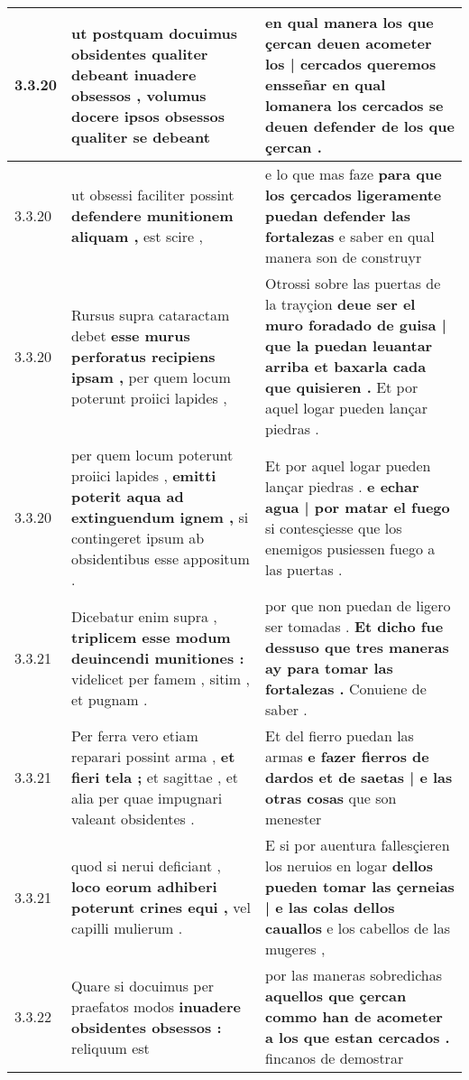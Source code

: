 \begin{tabular}{|p{1cm}|p{6.5cm}|p{6.5cm}|}
3.3.20 & ut postquam docuimus obsidentes qualiter debeant inuadere obsessos , \textbf{ volumus docere ipsos obsessos qualiter } se debeant & en qual manera \textbf{ los que çercan deuen acometer los | cercados queremos ensseñar en qual } lomanera los cercados se deuen defender de los que çercan . \\\hline
3.3.20 & ut obsessi faciliter possint \textbf{ defendere munitionem aliquam , } est scire , & e lo que mas faze \textbf{ para que los çercados ligeramente puedan defender las fortalezas } e saber en qual manera son de construyr \\\hline
3.3.20 & Rursus supra cataractam debet \textbf{ esse murus perforatus recipiens ipsam , } per quem locum poterunt proiici lapides , & Otrossi sobre las puertas de la trayçion \textbf{ deue ser el muro foradado de guisa | que la puedan leuantar arriba et baxarla cada que quisieren . } Et por aquel logar pueden lançar piedras . \\\hline
3.3.20 & per quem locum poterunt proiici lapides , \textbf{ emitti poterit aqua ad extinguendum ignem , } si contingeret ipsum ab obsidentibus esse appositum . & Et por aquel logar pueden lançar piedras . \textbf{ e echar agua | por matar el fuego } si contesçiesse que los enemigos pusiessen fuego a las puertas . \\\hline
3.3.21 & Dicebatur enim supra , \textbf{ triplicem esse modum deuincendi munitiones : } videlicet per famem , sitim , et pugnam . & por que non puedan de ligero ser tomadas . \textbf{ Et dicho fue dessuso que tres maneras ay para tomar las fortalezas . } Conuiene de saber . \\\hline
3.3.21 & Per ferra vero etiam reparari possint arma , \textbf{ et fieri tela ; } et sagittae , et alia per quae impugnari valeant obsidentes . & Et del fierro puedan las armas \textbf{ e fazer fierros de dardos et de saetas | e las otras cosas } que son menester \\\hline
3.3.21 & quod si nerui deficiant , \textbf{ loco eorum adhiberi poterunt crines equi , } vel capilli mulierum . & E si por auentura fallesçieren los neruios en logar \textbf{ dellos pueden tomar las çerneias | e las colas dellos cauallos } e los cabellos de las mugeres , \\\hline
3.3.22 & Quare si docuimus per praefatos modos \textbf{ inuadere obsidentes obsessos : } reliquum est & por las maneras sobredichas \textbf{ aquellos que çercan commo han de acometer a los que estan cercados . } fincanos de demostrar \\\hline

\end{tabular}
